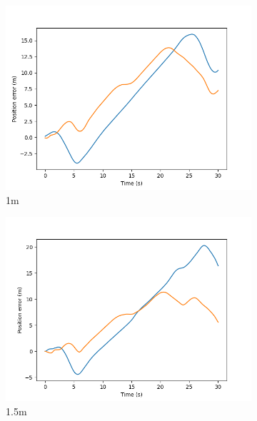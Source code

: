 \documentclass[class=article, crop=false]{standalone}
\begin{document}
\begin{figure}
\begin{subfigure}[b]{0.48\textwidth}
        \label{}
    \end{subfigure}
    \vfill
        \begin{subfigure}[b]{0.48\textwidth}
        \centering
        \includegraphics{scenario1/rov-0m/1.0m/usv_pos_error_controlled}
        \caption{1m}
        \label{}
    \end{subfigure}
    \hfill
        \begin{subfigure}[b]{0.48\textwidth}
        \centering
        \includegraphics{scenario1/rov-0m/1.5m/usv_pos_error_controlled}
        \caption{1.5m}
        \label{}
    \end{subfigure}
    \vfill
        \begin{subfigure}[b]{0.48\textwidth}

\end{subfigure}
\end{figure}
\end{document}
